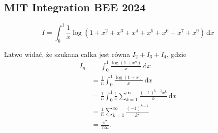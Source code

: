 %

\subsection{MIT Integration BEE 2024} %

\begin{problem}
    \begin{equation}
        I = \int_0^1 \frac 1 x \log (1 + x^2 + x^3 + x^4 + x^5 + x^6 + x^7 + x^9) \,\mathrm{d}x
    \end{equation}
\end{problem}

\begin{solution} %
    Łatwo widać, że szukana całka jest równa $I_2 + I_3 + I_4$, gdzie %
    \begin{align} %
        I_n & = \int_0^1 \frac {\log (1 + x^n)}{x} \,\mathrm{d}x \\ %
            & = \frac 1 n \int_0^1 \frac {\log (1 + x)}{x} \,\mathrm{d}x \\ %
            & = \frac 1 n \int_0^1 \frac 1 x \sum_{k=1}^\infty \frac{(-1)^{k-1}x^k}{k} \,\mathrm{d}x \\ %
            & = \frac 1 n \sum_{k=1}^\infty \frac{(-1)^{k-1}}{k^2} \\ %
            & = \frac {\pi^2}{12n}. %
    \end{align} %
\end{solution} %


%